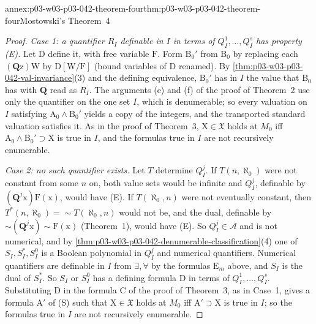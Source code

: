\begin{annexitem}{annex:p03-w03-p03-042-theorem-four}{thm:p03-w03-p03-042-theorem-four}{Mostowski's Theorem~4}
\begin{proof}
\emph{Case 1: a quantifier \(R_I\) definable in \(I\) in terms of
\(Q^1_I,\ldots,Q^s_I\) has property (E).}  Let \(\mathrm D\) define it,
with free variable \(\mathrm F\).  Form \(\mathrm B_0'\) from
\(\mathrm B_0\) by replacing each \((\mathbf Q\mathrm z)\mathrm W\) by
\(\mathrm D[\mathrm W/\mathrm F]\) (bound variables of \(\mathrm D\)
renamed).  By \cref{thm:p03-w03-p03-042-val-invariance}(3) and the defining
equivalence, \(\mathrm B_0'\) has in \(I\) the value that \(\mathrm B_0\)
has with \(\mathbf Q\) read as \(R_I\).  The arguments (e) and (f) of the
proof of Theorem~2 use only the quantifier on the one set \(I\), which is
denumerable; so every valuation on \(I\) satisfying \(\mathrm A_0\wedge
\mathrm B_0'\) yields a copy of the integers, and the transported standard
valuation satisfies it.  As in the proof of Theorem~3, \(\mathrm X\in
\mathfrak X\) holds at \(M_0\) iff \(\mathrm A_0\wedge\mathrm B_0'\supset
\mathrm X\) is true in \(I\), and the formulas true in \(I\) are not
recursively enumerable.

\emph{Case 2: no such quantifier exists.}  Let \(T\) determine \(Q^j_I\).
If \(T(n,\aleph_0)\) were not constant from some \(n\) on, both value sets
would be infinite and \(Q^j_I\), definable by \((\mathbf Q^j\mathrm x)
\mathrm F(\mathrm x)\), would have (E).  If \(T(\aleph_0,n)\) were not
eventually constant, then \(T^{*}(n,\aleph_0)={\sim}T(\aleph_0,n)\) would
not be, and the dual, definable by \({\sim}(\mathbf Q^j\mathrm x){\sim}
\mathrm F(\mathrm x)\) (Theorem~1), would have (E).  So
\(Q^j_I\in\mathcal A\) and is not numerical, and by
\cref{thm:p03-w03-p03-042-denumerable-classification}(4) one of
\(S_I,S^{*}_I,S^0_I\) is a Boolean polynomial in \(Q^j_I\) and numerical
quantifiers.  Numerical quantifiers are definable in \(I\) from
\(\exists,\forall\) by the formulas \(\mathrm E_m\) above, and \(S_I\) is
the dual of \(S^{*}_I\).  So \(S_I\) or \(S^0_I\) has a defining formula
\(\mathrm D\) in terms of \(Q^1_I,\ldots,Q^s_I\).  Substituting
\(\mathrm D\) in the formula \(\mathrm C\) of the proof of Theorem~3, as in
Case~1, gives a formula \(\mathrm A'\) of (S) such that \(\mathrm X\in
\mathfrak X\) holds at \(M_0\) iff \(\mathrm A'\supset\mathrm X\) is true
in \(I\); so the formulas true in \(I\) are not recursively enumerable.
\end{proof}
\end{annexitem}

